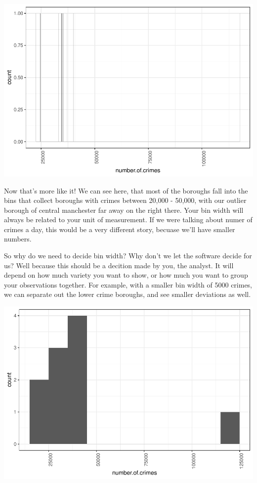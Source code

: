 \documentclass[
]{book}
\begin{document}
\includegraphics{bookdown-demo_files/figure-latex/unnamed-chunk-21-1.pdf}

Now that's more like it! We can see here, that most of the boroughs fall into the bins that collect boroughs with crimes between 20,000 - 50,000, with our outlier borough of central manchester far away on the right there. Your bin width will always be related to your unit of measurement. If we were talking about numer of crimes a day, this would be a very different story, becuase we'll have smaller numbers.

So why do we need to decide bin width? Why don't we let the software decide for us? Well because this should be a decition made by you, the analyst. It will depend on how much variety you want to show, or how much you want to group your observations together. For example, with a smaller bin width of 5000 crimes, we can separate out the lower crime boroughs, and see smaller deviations as well.

\includegraphics{bookdown-demo_files/figure-latex/unnamed-chunk-22-1.pdf}
\end{document}
